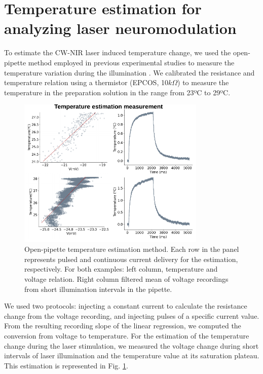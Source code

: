 \section{Temperature estimation for analyzing laser neuromodulation}
\label{sec:temperature-estimation}
To estimate the CW-NIR laser induced temperature change, we used the open-pipette method employed in previous experimental studies to measure the temperature variation during the illumination \parencite{li_temporal_2013, rabbitt_heat_2016,brown_thermal_2020, brown_response_2021}. We calibrated the resistance and temperature relation using a thermistor (EPCOS, 10$k\Omega$) to measure the temperature in the preparation solution in the range from 23ºC to 29ºC. \begin{figure}[htb!]
	\centering
	\includegraphics[width=0.8\textwidth]{img/laser/temperature_estimation.pdf}
	\caption{Open-pipette temperature estimation method. Each row in the panel represents pulsed and continuous current delivery for the estimation, respectively. For both examples: left column, temperature and voltage relation. Right column filtered mean of voltage recordings from short illumination intervals in the pipette. }
	\label{fig:temperature estimation}
\end{figure}We used two protocols:  injecting a constant current to calculate the resistance change from the voltage recording, and injecting pulses of a specific current value. From the resulting recording slope of the linear regression, we computed the conversion from voltage to temperature. For the estimation of the temperature change during the laser stimulation, we measured the voltage change during short intervals of laser illumination and the temperature value at its saturation plateau. This estimation is represented in Fig. \ref{fig:temperature estimation}.
